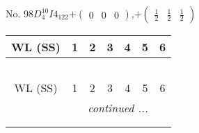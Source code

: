 \documentclass[fleqn,9pt,landscape]{jsarticle}
\begin{document}
\newpage
No. 98\quad$D_{4}^{10}$\quad$I4_122$\quad[ tetragonal ]\quad$+\begin{pmatrix} 0 & 0 & 0 \end{pmatrix}$,\quad $+\begin{pmatrix} \frac{1}{2} & \frac{1}{2} & \frac{1}{2} \end{pmatrix}$
\begin{center}
\renewcommand{\arraystretch}{1.2}
\begin{longtable}{ccccccc}
 \hline \hline
WL (SS) & 1 & 2 & 3 & 4 & 5 & 6 \\ \hline \endfirsthead

\multicolumn{6}{l}{\tablename\ \thetable{}} \\
 \hline \hline
WL (SS) & 1 & 2 & 3 & 4 & 5 & 6 \\ \hline \endhead

 \hline \hline
\multicolumn{6}{r}{\footnotesize\it continued ...} \\ \endfoot

 \hline \hline
\multicolumn{6}{r}{} \\ \endlastfoot


\end{longtable}
\end{center}
\end{document}

